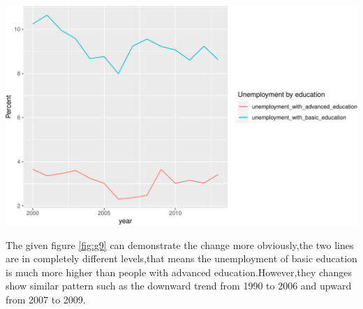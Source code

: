\documentclass[11pt,a4paper,]{article}
\begin{document}
\begin{center}\includegraphics{Figures/g9-1} \end{center}

The given figure \ref{fig:g9} can demonstrate the change more obviously,the two lines are in completely different levels,that means the unemployment of basic education is much more higher than people with advanced education.However,they changes show similar pattern such as the downward trend from 1990 to 2006 and upward from 2007 to 2009.
\end{document}

